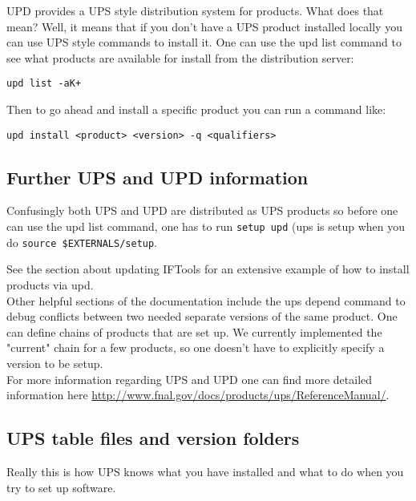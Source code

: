 \documentclass[letterpaper,10pt]{article}
\begin{document}
UPD provides a UPS style distribution system for products. What does that mean? Well, it means that if you don't have a UPS product installed locally you can use UPS style commands to install it. One can use the upd list command to see what products are available for install from the distribution server:

\begin{verbatim}
upd list -aK+
\end{verbatim}
\noindent
Then to go ahead and install a specific product you can run a command like:

\begin{verbatim}
upd install <product> <version> -q <qualifiers>
\end{verbatim}

\subsection{Further UPS and UPD information}

Confusingly both UPS and UPD are distributed as UPS products so before one can use the upd list command, one has to run \verb|setup upd| (ups is setup when you do \verb|source $EXTERNALS/setup|.

See the section about updating IFTools for an extensive example of how to install products via upd.\\

Other helpful sections of the documentation include the ups depend command to debug conflicts between two needed separate versions of the same product. One can define chains of products that are set up. We currently implemented the "current" chain for a few products, so one doesn't have to explicitly specify a version to be setup.\\

For more information regarding UPS and UPD one can find more detailed information here \url{http://www.fnal.gov/docs/products/ups/ReferenceManual/}.


\subsection{UPS table files and version folders }

Really this is how UPS knows what you have installed and what to do when you try to set up software.\\
\end{document}
